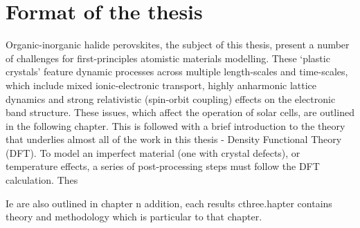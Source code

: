 
\section{Format of the thesis}

Organic-inorganic halide perovskites, the subject of this thesis, present a number of challenges for first-principles atomistic materials modelling. These `plastic crystals' feature dynamic processes across multiple length-scales and time-scales, which include mixed ionic-electronic transport, highly anharmonic lattice dynamics and strong relativistic (spin-orbit coupling) effects on the electronic band structure.
These issues, which affect the operation of solar cells, are outlined in the following chapter. 
This is followed with a brief introduction to the theory that underlies almost all of the work in this thesis - Density Functional Theory (DFT). 
To model an imperfect material (one with crystal defects), or temperature effects, a series of post-processing steps must follow the DFT calculation. Thes



Ie are also outlined in chapter n addition, each results cthree.hapter contains theory and methodology which is particular to that chapter.

